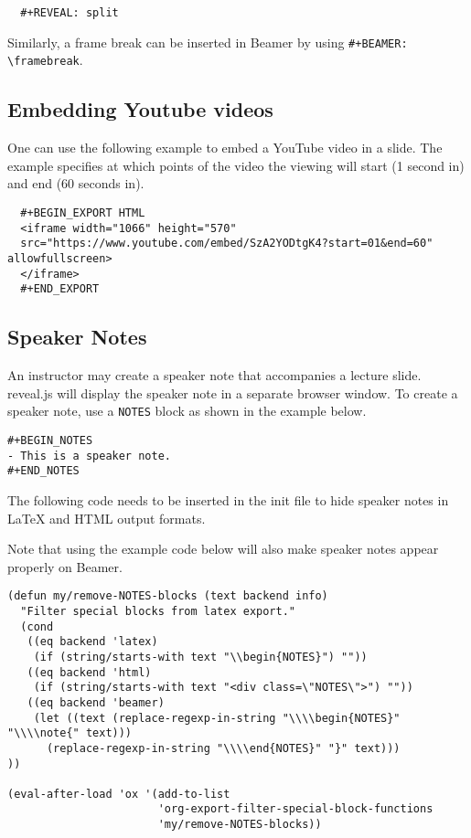 \documentclass[10pt,article]{article}
\begin{document}
\begin{verbatim}
  #+REVEAL: split
\end{verbatim}

\begin{mdframed}
Similarly, a frame break can be inserted in Beamer by using \texttt{\#+BEAMER:
\textbackslash{}framebreak}.
\end{mdframed}

\subsection{Embedding Youtube videos}
\label{sec:orge84475f}
One can use the following example to embed a YouTube video in a slide. The
example specifies at which points of the video the viewing will start
(1 second in) and end (60 seconds in).
{\small
\begin{verbatim}
  #+BEGIN_EXPORT HTML
  <iframe width="1066" height="570"
  src="https://www.youtube.com/embed/SzA2YODtgK4?start=01&end=60" allowfullscreen>
  </iframe>
  #+END_EXPORT
\end{verbatim}
}
\subsection{Speaker Notes}
\label{sec:org7ffce18}
An instructor may create a speaker note that accompanies a lecture
slide. reveal.js will display the speaker note in a separate browser
window. To create a speaker note, use a \texttt{NOTES} block as shown in the example
below.

\begin{verbatim}
#+BEGIN_NOTES
- This is a speaker note.
#+END_NOTES
\end{verbatim}

The following code needs to be inserted in the init file to hide speaker
notes in \LaTeX{} and HTML output formats.

\begin{mdframed}
Note that using the example code below will also make speaker notes appear
properly on Beamer.
\end{mdframed}

{\small
\begin{verbatim}
(defun my/remove-NOTES-blocks (text backend info)
  "Filter special blocks from latex export."
  (cond
   ((eq backend 'latex)
    (if (string/starts-with text "\\begin{NOTES}") ""))
   ((eq backend 'html)
    (if (string/starts-with text "<div class=\"NOTES\">") ""))
   ((eq backend 'beamer)
    (let ((text (replace-regexp-in-string "\\\\begin{NOTES}" "\\\\note{" text)))
      (replace-regexp-in-string "\\\\end{NOTES}" "}" text)))
))

(eval-after-load 'ox '(add-to-list
                       'org-export-filter-special-block-functions
                       'my/remove-NOTES-blocks))

\end{verbatim}
}
\end{document}
